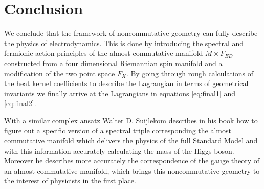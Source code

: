 \section{Conclusion}
We conclude that the framework of noncommutative geometry can fully describe
the physics of electrodynamics. This is done by introducing the spectral and
fermionic action principles of the almost commutative manifold $M \times F_{ED}$
constructed from a four dimensional Riemannian spin manifold and a
modification of the two point space $F_X$. By going through rough
calculations of the heat kernel coefficients to describe the Lagrangian in
terms of geometrical invariants we finally arrive at the Lagrangians in
equations \eqref{eq:final1} and \eqref{eq:final2}.

With a similar complex ansatz Walter D. Suijlekom describes in his book
\cite{ncgwalter} how to figure out a specific version of a spectral triple
corresponding the almost commutative manifold which delivers the physics of
the full Standard Model and with this information accurately calculating the
mass of the Higgs boson. Moreover he describes more accurately the
correspondence of the gauge theory of an almost commutative manifold, which
brings this noncommutative geometry to the interest of physicists in the first place.
